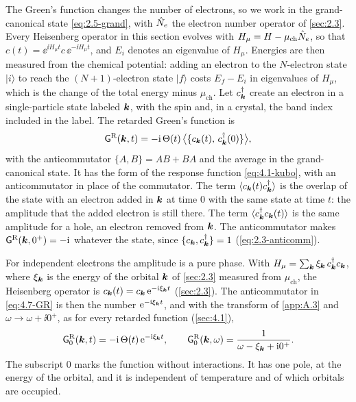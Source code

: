 The Green's function changes the number of electrons, so we work in the grand-canonical state \cref{eq:2.5-grand}, with $\hat{N}_e$ the electron number operator of \cref{sec:2.3}. Every Heisenberg operator in this section evolves with $H_\mu = H - \mu_{\mathrm{ch}}\hat{N}_e$, so that $c(t) = \ee^{\ii H_\mu t}c\,\ee^{-\ii H_\mu t}$, and $E_i$ denotes an eigenvalue of $H_\mu$. Energies are then measured from the chemical potential: adding an electron to the $N$-electron state $|i\rangle$ to reach the $(N+1)$-electron state $|f\rangle$ costs $E_f - E_i$ in eigenvalues of $H_\mu$, which is the change of the total energy minus $\mu_{\mathrm{ch}}$. Let $c^\dagger_{\bm{k}}$ create an electron in a single-particle state labeled $\bm{k}$, with the spin and, in a crystal, the band index included in the label. The retarded Green's function is
\begin{equation}
  \mathsf{G}^{\mathrm{R}}(\bm{k},t) = -\mathrm{i}\,\Theta(t)\,\bigl\langle\{c_{\bm{k}}(t),\,c^\dagger_{\bm{k}}(0)\}\bigr\rangle ,
  \label{eq:4.7-GR}
\end{equation}
with the anticommutator $\{A, B\} = AB + BA$ and the average in the grand-canonical state. It has the form of the response function \cref{eq:4.1-kubo}, with an anticommutator in place of the commutator. The term $\langle c_{\bm{k}}(t)c^\dagger_{\bm{k}}\rangle$ is the overlap of the state with an electron added in $\bm{k}$ at time $0$ with the same state at time $t$: the amplitude that the added electron is still there. The term $\langle c^\dagger_{\bm{k}}c_{\bm{k}}(t)\rangle$ is the same amplitude for a hole, an electron removed from $\bm{k}$. The anticommutator makes $\mathsf{G}^{\mathrm{R}}(\bm{k},0^+) = -\mathrm{i}$ whatever the state, since $\{c_{\bm{k}}, c^\dagger_{\bm{k}}\} = 1$ (\cref{eq:2.3-anticomm}).

For independent electrons the amplitude is a pure phase. With $H_\mu = \sum_{\bm{k}}\xi_{\bm{k}}\,c^\dagger_{\bm{k}}c_{\bm{k}}$, where $\xi_{\bm{k}}$ is the energy of the orbital $\bm{k}$ of \cref{sec:2.3} measured from $\mu_{\mathrm{ch}}$, the Heisenberg operator is $c_{\bm{k}}(t) = c_{\bm{k}}\,\mathrm{e}^{-\mathrm{i}\xi_{\bm{k}}t}$ (\cref{sec:2.3}). The anticommutator in \cref{eq:4.7-GR} is then the number $\mathrm{e}^{-\mathrm{i}\xi_{\bm{k}}t}$, and with the transform of \cref{app:A.3} and $\omega \to \omega + \ii0^+$, as for every retarded function (\cref{sec:4.1}),
\begin{equation}
  \mathsf{G}^{\mathrm{R}}_0(\bm{k},t) = -\mathrm{i}\,\Theta(t)\,\mathrm{e}^{-\mathrm{i}\xi_{\bm{k}}t}, \qquad
  \mathsf{G}^{\mathrm{R}}_0(\bm{k},\omega) = \frac{1}{\omega - \xi_{\bm{k}} + \mathrm{i}0^+} .
  \label{eq:4.7-G0}
\end{equation}
The subscript $0$ marks the function without interactions. It has one pole, at the energy of the orbital, and it is independent of temperature and of which orbitals are occupied.

